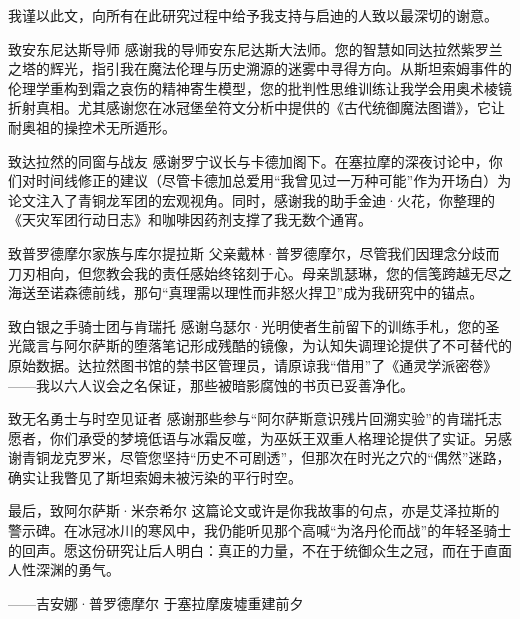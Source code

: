 \hspace*{2em}我谨以此文，向所有在此研究过程中给予我支持与启迪的人致以最深切的谢意。

致安东尼达斯导师
感谢我的导师安东尼达斯大法师。您的智慧如同达拉然紫罗兰之塔的辉光，指引我在魔法伦理与历史溯源的迷雾中寻得方向。从斯坦索姆事件的伦理学重构到霜之哀伤的精神寄生模型，您的批判性思维训练让我学会用奥术棱镜折射真相。尤其感谢您在冰冠堡垒符文分析中提供的《古代统御魔法图谱》，它让耐奥祖的操控术无所遁形。

致达拉然的同窗与战友
感谢罗宁议长与卡德加阁下。在塞拉摩的深夜讨论中，你们对时间线修正的建议（尽管卡德加总爱用“我曾见过一万种可能”作为开场白）为论文注入了青铜龙军团的宏观视角。同时，感谢我的助手金迪·火花，你整理的《天灾军团行动日志》和咖啡因药剂支撑了我无数个通宵。

致普罗德摩尔家族与库尔提拉斯
父亲戴林·普罗德摩尔，尽管我们因理念分歧而刀刃相向，但您教会我的责任感始终铭刻于心。母亲凯瑟琳，您的信笺跨越无尽之海送至诺森德前线，那句“真理需以理性而非怒火捍卫”成为我研究中的锚点。

致白银之手骑士团与肯瑞托
感谢乌瑟尔·光明使者生前留下的训练手札，您的圣光箴言与阿尔萨斯的堕落笔记形成残酷的镜像，为认知失调理论提供了不可替代的原始数据。达拉然图书馆的禁书区管理员，请原谅我“借用”了《通灵学派密卷》——我以六人议会之名保证，那些被暗影腐蚀的书页已妥善净化。

致无名勇士与时空见证者
感谢那些参与“阿尔萨斯意识残片回溯实验”的肯瑞托志愿者，你们承受的梦境低语与冰霜反噬，为巫妖王双重人格理论提供了实证。另感谢青铜龙克罗米，尽管您坚持“历史不可剧透”，但那次在时光之穴的“偶然”迷路，确实让我瞥见了斯坦索姆未被污染的平行时空。

最后，致阿尔萨斯·米奈希尔
这篇论文或许是你我故事的句点，亦是艾泽拉斯的警示碑。在冰冠冰川的寒风中，我仍能听见那个高喊“为洛丹伦而战”的年轻圣骑士的回声。愿这份研究让后人明白：真正的力量，不在于统御众生之冠，而在于直面人性深渊的勇气。

——吉安娜·普罗德摩尔
于塞拉摩废墟重建前夕